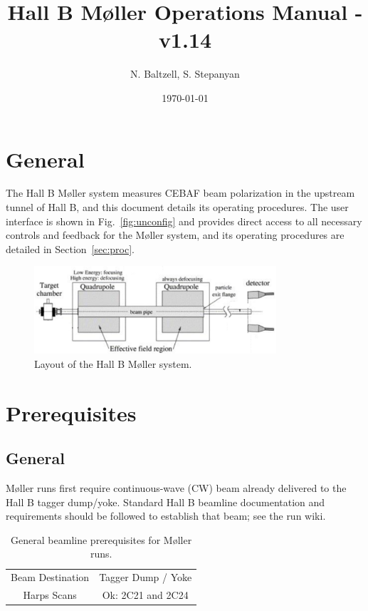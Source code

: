 \documentclass[amsmath,amssymb,notitlepage,12pt]{revtex4}
\begin{document}
\title{Hall B M{\o}ller Operations Manual - v1.14}
\date{\today}
\author{N. Baltzell, S. Stepanyan}
\begin{abstract}
\end{abstract}
\maketitle

\tableofcontents

\newpage 

\section{General}

The Hall B M{\o}ller system measures CEBAF beam polarization in the upstream tunnel of Hall B, and this document details its operating procedures.  The user interface is shown in Fig.~\ref{fig:unconfig} and provides direct access to all necessary controls and feedback for the M{\o}ller system, and its operating procedures are detailed in Section~\ref{sec:proc}.

\begin{figure}[htbp]\centering
    \includegraphics[width=9cm]{pics/layout}
    \caption{\label{fig:layout}Layout of the Hall B M{\o}ller system.}
\end{figure}

\section{Prerequisites}\label{sec:prereq}

\subsection{General}

M{\o}ller runs first require continuous-wave (CW) beam already delivered to the Hall B tagger dump/yoke.  Standard Hall B beamline documentation and requirements should be followed to establish that beam;  see the run wiki.

\begin{table}[htbp]\centering
    \begin{tabular}{c|c}\toprule[1.5pt]
        Beam Destination & Tagger Dump / Yoke \\
        Harps Scans & Ok: 2C21 and 2C24\\ 
        \bottomrule[1.5pt]
    \end{tabular}
    \caption{General beamline prerequisites for M{\o}ller runs.}
\end{table}
\end{document}
